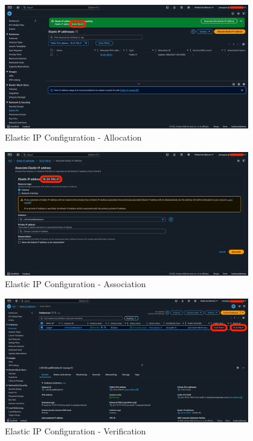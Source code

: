 \documentclass[a4paper,12pt]{article}
\begin{document}
\begin{figure}[H]
    \centering
    \includegraphics[width=0.95\textwidth]{elastic-ip-1.png}
    \caption{Elastic IP Configuration - Allocation}
    \label{fig:elastic1}
\end{figure}

\begin{figure}[H]
    \centering
    \includegraphics[width=0.95\textwidth]{elastic-ip-2.png}
    \caption{Elastic IP Configuration - Association}
    \label{fig:elastic2}
\end{figure}

\begin{figure}[H]
    \centering
    \includegraphics[width=0.95\textwidth]{elastic-ip-3.png}
    \caption{Elastic IP Configuration - Verification}
    \label{fig:elastic3}
\end{figure}
\end{document}
